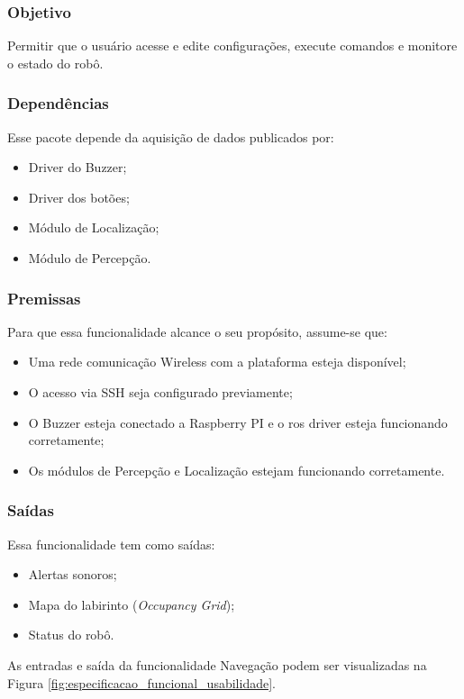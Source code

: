 \subsubsection{Objetivo}
Permitir que o usuário acesse e edite configurações, execute comandos e monitore o estado do robô.

\subsubsection{Dependências}
Esse pacote depende da aquisição de dados publicados por:
\begin{itemize}
	\item Driver do Buzzer;
	\item Driver dos botões;
	\item Módulo de Localização;
	\item Módulo de Percepção.
\end{itemize}

\subsubsection{Premissas}
Para que essa funcionalidade alcance o seu propósito, assume-se que:
\begin{itemize}
	\item Uma rede comunicação Wireless com a plataforma esteja disponível;
	\item O acesso via SSH seja configurado previamente;
	\item O Buzzer esteja conectado a Raspberry PI e o \gls*{ros} driver esteja funcionando corretamente;
	\item  Os módulos de Percepção e Localização estejam funcionando corretamente.
\end{itemize}

\subsubsection{Saídas}
Essa funcionalidade tem como saídas:
\begin{itemize}
	\item Alertas sonoros;
	\item Mapa do labirinto (\textit{Occupancy Grid});
	\item Status do robô.
\end{itemize}

As entradas e saída da funcionalidade Navegação podem ser visualizadas na Figura \ref{fig:especificacao_funcional_usabilidade}.

